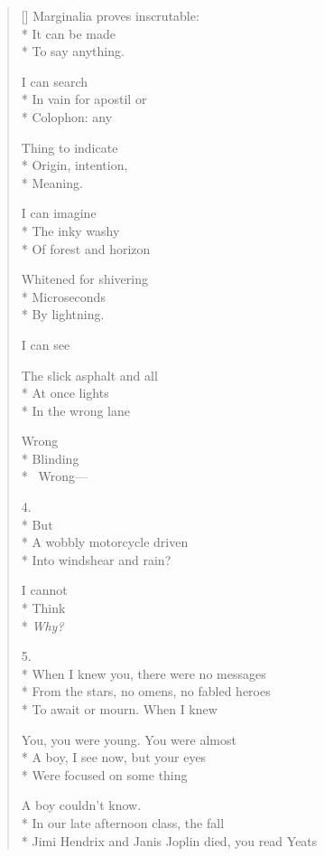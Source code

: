\begin{verse}[\versewidth]
Marginalia proves inscrutable:\\*
It can be made\\*
To say anything.

\hspace{3\vgap} I can search\\*
In vain for apostil or\\*
Colophon: any

Thing to indicate\\*
Origin, intention,\\*
Meaning.

\hspace{3\vgap} I can imagine\\*
The inky washy\\*
Of forest and horizon

Whitened for shivering\\*
Microseconds\\*
By lightning.

\hspace{3\vgap} I can see

The slick asphalt and all\\*
At once lights\\*
In the wrong lane

\hspace{3\vgap} Wrong\\*
Blinding\\*
\hspace{1\vgap} Wrong---

4.\\*
\hspace{3\vgap} But\\*
A wobbly motorcycle driven\\*
Into windshear and rain?

\hspace{4\vgap} I cannot\\*
Think\\*
\textit{Why?}

5.\\*
When I knew you, there were no messages\\*
From the stars, no omens, no fabled heroes\\*
To await or mourn. When I knew

You, you were young. You were almost\\*
A boy, I see now, but your eyes\\*
Were focused on some thing

A boy couldn't know.\\*
In our late afternoon class, the fall\\*
Jimi Hendrix and Janis Joplin died, you read Yeats


\end{verse}
